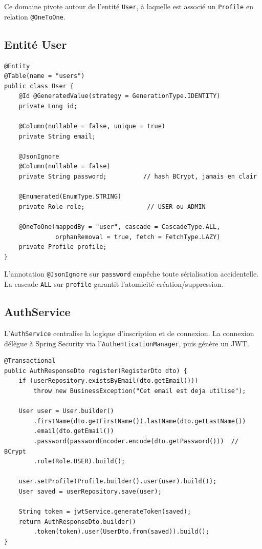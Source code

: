 \documentclass[11pt,a4paper,oneside]{report}
\begin{document}
Ce domaine pivote autour de l'entité \texttt{User}, à laquelle est associé
un \texttt{Profile} en relation \texttt{@OneToOne}.

\subsection{Entité User}

\begin{lstlisting}[style=javastyle, caption=Entite User (extrait)]
@Entity
@Table(name = "users")
public class User {
    @Id @GeneratedValue(strategy = GenerationType.IDENTITY)
    private Long id;

    @Column(nullable = false, unique = true)
    private String email;

    @JsonIgnore
    @Column(nullable = false)
    private String password;          // hash BCrypt, jamais en clair

    @Enumerated(EnumType.STRING)
    private Role role;                 // USER ou ADMIN

    @OneToOne(mappedBy = "user", cascade = CascadeType.ALL,
              orphanRemoval = true, fetch = FetchType.LAZY)
    private Profile profile;
}
\end{lstlisting}

L'annotation \texttt{@JsonIgnore} sur \texttt{password} empêche toute
sérialisation accidentelle. La cascade \texttt{ALL} sur \texttt{profile}
garantit l'atomicité création/suppression.

\subsection{AuthService}

L'\texttt{AuthService} centralise la logique d'inscription et de connexion.
La connexion délègue à Spring Security via l'\texttt{AuthenticationManager},
puis génère un JWT.

\begin{lstlisting}[style=javastyle, caption=Methode register de AuthService]
@Transactional
public AuthResponseDto register(RegisterDto dto) {
    if (userRepository.existsByEmail(dto.getEmail()))
        throw new BusinessException("Cet email est deja utilise");

    User user = User.builder()
        .firstName(dto.getFirstName()).lastName(dto.getLastName())
        .email(dto.getEmail())
        .password(passwordEncoder.encode(dto.getPassword()))  // BCrypt
        .role(Role.USER).build();

    user.setProfile(Profile.builder().user(user).build());
    User saved = userRepository.save(user);

    String token = jwtService.generateToken(saved);
    return AuthResponseDto.builder()
        .token(token).user(UserDto.from(saved)).build();
}
\end{lstlisting}
\end{document}
